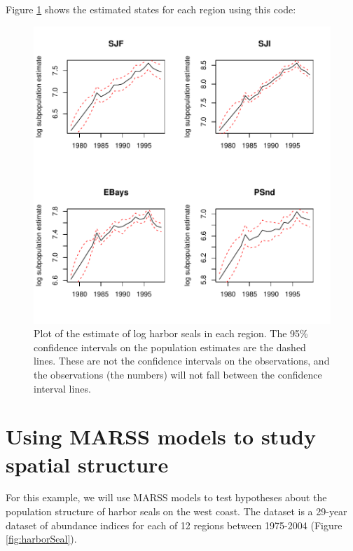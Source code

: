 Figure \ref{fig:mss.fit.1.states} shows the estimated states for each region using this code:
\begin{Schunk}
\end{Schunk}

\begin{figure}[htp]
\begin{center}
\includegraphics{./figures/MSS--fig2_plot}
\end{center}
\caption{Plot of the estimate of log harbor seals in each region. The 95\% confidence intervals on the population estimates are the dashed lines.  These are not the confidence intervals on the observations, and the observations (the numbers) will not fall between the confidence interval lines.}
\label{fig:mss.fit.1.states}
\end{figure}

\section{Using MARSS models to study spatial structure}
For this example, we will use MARSS models to test hypotheses about the population structure of harbor seals on the west coast.   The dataset \verb@harborSeal@ is a 29-year dataset of abundance indices for each of 12 regions between 1975-2004 (Figure \ref{fig:harborSeal}). 

